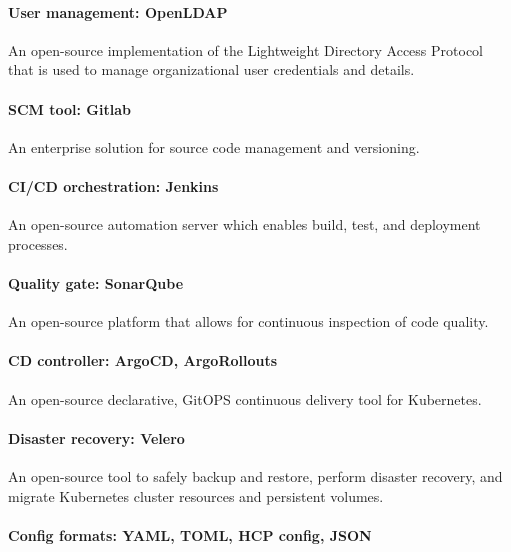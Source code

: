 \paragraph{User management: OpenLDAP }

\hspace{7mm}An open-source implementation of the Lightweight Directory Access Protocol that is used to manage organizational user credentials and details. 

\paragraph{SCM tool: Gitlab }

\hspace{7mm}An enterprise solution for source code management and versioning. 

\paragraph{CI/CD orchestration: Jenkins }

\hspace{7mm}An open-source automation server which enables build, test, and deployment processes. 

\paragraph{Quality gate: SonarQube }

\hspace{7mm}An open-source platform that allows for continuous inspection of code quality. 

\paragraph{CD controller: ArgoCD, ArgoRollouts }

\hspace{7mm}An open-source declarative, GitOPS continuous delivery tool for Kubernetes. 

\paragraph{Disaster recovery: Velero }

\hspace{7mm}An open-source tool to safely backup and restore, perform disaster recovery, and migrate Kubernetes cluster resources and persistent volumes. 

\paragraph{Config formats: YAML, TOML, HCP config, JSON }

